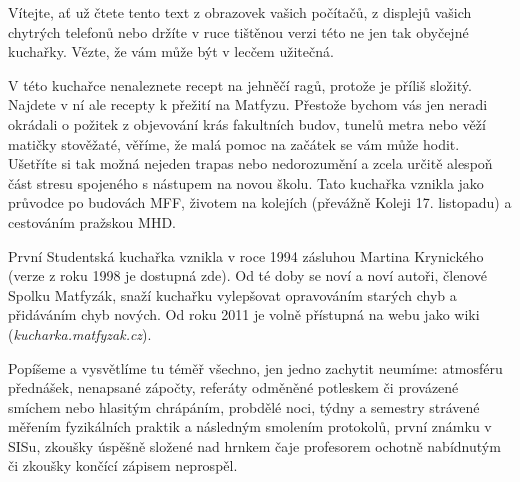 Vítejte, ať už čtete tento text z obrazovek vašich počítačů,
z displejů vašich chytrých telefonů nebo držíte v ruce tištěnou verzi této ne
jen tak obyčejné kuchařky. Vězte, že vám může být v lecčem užitečná.


V této kuchařce nenaleznete recept na jehněčí ragů, protože je příliš složitý.
Najdete v ní ale recepty k přežití na Matfyzu.
Přestože bychom vás jen neradi okrádali o požitek z objevování krás
fakultních budov, tunelů metra nebo věží matičky stověžaté, věříme,
že malá pomoc na začátek se vám může hodit.
Ušetříte si tak možná nejeden trapas nebo nedorozumění a zcela určitě
alespoň část stresu spojeného s nástupem na novou školu.
Tato kuchařka vznikla jako průvodce po budovách MFF,
životem na kolejích (převážně Koleji 17. listopadu) a cestováním pražskou MHD.


První Studentská kuchařka vznikla v roce 1994 zásluhou Martina Krynického
(verze z roku 1998 je dostupná zde).
Od té doby se noví a noví autoři, členové Spolku Matfyzák,
snaží kuchařku vylepšovat opravováním starých chyb a přidáváním chyb nových.
Od roku 2011 je volně přístupná na webu jako wiki (\textit{kucharka.matfyzak.cz}).


Popíšeme a vysvětlíme tu téměř všechno, jen jedno zachytit neumíme:
atmosféru přednášek, nenapsané zápočty, referáty odměněné potleskem
či provázené smíchem nebo hlasitým chrápáním, probdělé noci,
týdny a semestry strávené měřením fyzikálních praktik a následným
smolením protokolů, první známku v SISu, zkoušky úspěšně složené
nad hrnkem čaje profesorem ochotně nabídnutým či zkoušky končící
zápisem neprospěl.